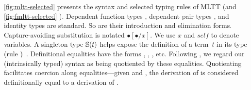 
\cref{fig:mltt-selected} presents the syntax and selected typing rules of MLTT %
(and \cref{fig:fmltt-selected} \TT).
Dependent function types ,
dependent pair types , and
identity types  are standard.
So are their introduction and elimination forms.
Capture-avoiding substitution is notated $\bullet[\bullet/x]$.
We use $x$ and $\mathit{self}$ to denote variables.
A singleton type $\mathbb{S}({t})$ helps expose the definition of a term~$t$
in its type (rule )~\cite{aspinall1995singleton,stone2000}.
Definitional equalities have the forms %
,
,
,
etc.
Following \citet{altkap2016}, we regard our (intrinsically typed) syntax
as being quotiented by these equalities.
Quotienting facilitates coercion along equalities---given
 and
,
the derivation of  is considered definitionally equal to
a derivation of . %
